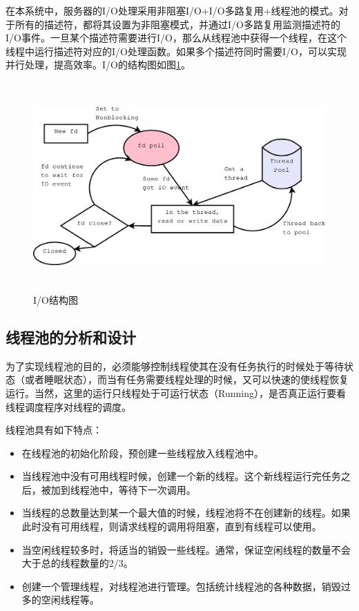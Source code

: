 \documentclass[twoside, xetex]{report}
\begin{document}
	在本系统中，服务器的I/O处理采用非阻塞I/O+I/O多路复用+线程池的模式。对于所有的描述符，都将其设置为非阻塞模式，并通过I/O多路复用监测描述符的I/O事件。一旦某个描述符需要进行I/O，那么从线程池中获得一个线程，在这个线程中运行描述符对应的I/O处理函数。如果多个描述符同时需要I/O，可以实现并行处理，提高效率。I/O的结构图如图\ref{IO}。
	
	\begin{figure}[htbp]
	\centering
	\includegraphics[height=8cm, width=15cm]{pics/IO.eps}
	\caption{I/O结构图}
	\label{IO}
	\end{figure}
	
\subsection{线程池的分析和设计}
	为了实现线程池的目的，必须能够控制线程使其在没有任务执行的时候处于等待状态（或者睡眠状态），而当有任务需要线程处理的时候，又可以快速的使线程恢复运行。当然，这里的运行只线程处于可运行状态（Running），是否真正运行要看线程调度程序对线程的调度。
	
	线程池具有如下特点：
	\begin{itemize}
		\item 在线程池的初始化阶段，预创建一些线程放入线程池中。
		\item 当线程池中没有可用线程时候，创建一个新的线程。这个新线程运行完任务之后，被加到线程池中，等待下一次调用。
		\item 当线程的总数量达到某一个最大值的时候，线程池将不在创建新的线程。如果此时没有可用线程，则请求线程的调用将阻塞，直到有线程可以使用。
		\item 当空闲线程较多时，将适当的销毁一些线程。通常，保证空闲线程的数量不会大于总的线程数量的2/3。
		\item 创建一个管理线程，对线程池进行管理。包括统计线程池的各种数据，销毁过多的空闲线程等。
	\end{itemize}
	
\end{document}

